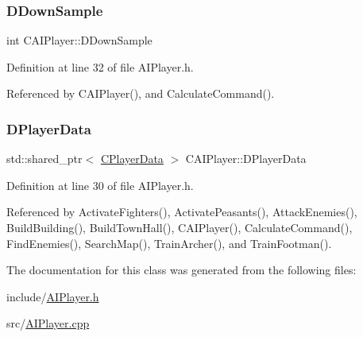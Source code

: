 \hypertarget{classCAIPlayer_a091aed92cb9ad1a789900a6394d2f352}{}\label{classCAIPlayer_a091aed92cb9ad1a789900a6394d2f352} 
\subsubsection{\texorpdfstring{D\+Down\+Sample}{DDownSample}}
{\footnotesize\ttfamily int C\+A\+I\+Player\+::\+D\+Down\+Sample\hspace{0.3cm}{\ttfamily [protected]}}



Definition at line 32 of file A\+I\+Player.\+h.



Referenced by C\+A\+I\+Player(), and Calculate\+Command().

\hypertarget{classCAIPlayer_a83b5113c8f7e80df54940b647c5ee2e6}{}\label{classCAIPlayer_a83b5113c8f7e80df54940b647c5ee2e6} 
\subsubsection{\texorpdfstring{D\+Player\+Data}{DPlayerData}}
{\footnotesize\ttfamily std\+::shared\+\_\+ptr$<$ \hyperlink{classCPlayerData}{C\+Player\+Data} $>$ C\+A\+I\+Player\+::\+D\+Player\+Data\hspace{0.3cm}{\ttfamily [protected]}}



Definition at line 30 of file A\+I\+Player.\+h.



Referenced by Activate\+Fighters(), Activate\+Peasants(), Attack\+Enemies(), Build\+Building(), Build\+Town\+Hall(), C\+A\+I\+Player(), Calculate\+Command(), Find\+Enemies(), Search\+Map(), Train\+Archer(), and Train\+Footman().



The documentation for this class was generated from the following files\+:\begin{DoxyCompactItemize}
\item 
include/\hyperlink{AIPlayer_8h}{A\+I\+Player.\+h}\item 
src/\hyperlink{AIPlayer_8cpp}{A\+I\+Player.\+cpp}\end{DoxyCompactItemize}
